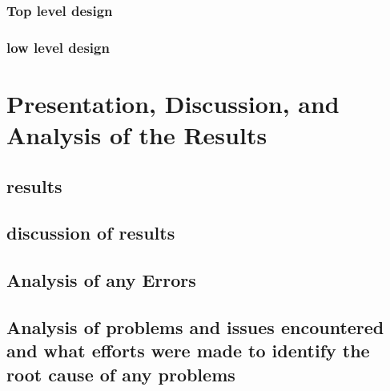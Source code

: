 \documentclass[12pt]{article} %
\begin{document}
\subsubsection{Top level design }
%

\subsubsection{low level design  }
%

\section{Presentation, Discussion, and Analysis of the Results}
%
%
\subsection{results }

\subsection{discussion of results }

\subsection{Analysis of any Errors }
%

\subsection{Analysis of problems and issues encountered and what efforts were
made to identify the root cause of any problems  }
%
%
\end{document}
